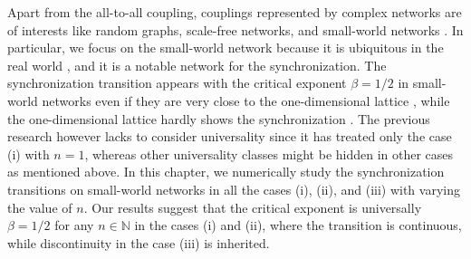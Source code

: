 
Apart from the all-to-all coupling,
couplings represented by complex networks are of interests
like random graphs, scale-free networks, and small-world networks \cite{dorogovtsev2008}.
In particular,
we focus on the small-world network
because it is ubiquitous in the real world \cite{watts1998},
and it is a notable network for the synchronization.
The synchronization transition appears
with the critical exponent $\beta=1/2$ in small-world networks
even if they are very close to the one-dimensional lattice \cite{hong2002},
while the one-dimensional lattice hardly shows the synchronization
\cite{sakaguchi1987,daido1988,hong2002}.
The previous research \cite{hong2002} however
lacks to consider universality
since it has treated only the case (i) with $n=1$,
whereas other universality classes might be hidden in other cases
as mentioned above.
In this chapter, we numerically study the synchronization transitions
on small-world networks in all the cases (i), (ii), and (iii)
with varying the value of $n$.
Our results suggest that the critical exponent is
universally $\beta=1/2$ for any $n\in\mathbb{N}$
in the cases (i) and (ii), where the transition is continuous,
while discontinuity in the case (iii) is inherited.



